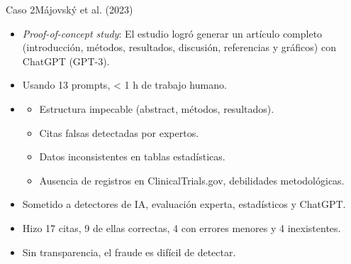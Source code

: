 \begin{frame}{Caso 2}{Májovský et al. (2023)}

    \begin{itemize}
        \item \textit{Proof-of-concept study}\cite{majovsky2023}:
              El estudio logró generar un artículo completo (introducción, métodos, resultados, discusión, referencias y gráficos) con ChatGPT (GPT-3).
        \item Usando 13 prompts, < 1 h de trabajo humano.
        \item {}
              \begin{itemize}
                  \item Estructura impecable (abstract, métodos, resultados).
                  \item Citas falsas detectadas por expertos.
                  \item Datos inconsistentes en tablas estadísticas.
                  \item Ausencia de registros en ClinicalTrials.gov, debilidades metodológicas.
              \end{itemize}
        \item {} Sometido a detectores de IA, evaluación experta, estadísticos y ChatGPT.
        \item {} Hizo \alert{17 citas}, 9 de ellas correctas, 4 con errores menores y \alert{4 inexistentes}.
        \item {} Sin transparencia, el fraude es difícil de detectar.
    \end{itemize}
\end{frame}

